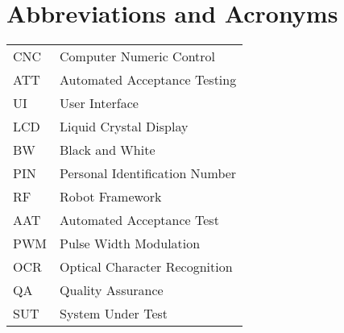 
\chapter*{Abbreviations and Acronyms}


\noindent
\begin{longtable}{@{}p{}p{}@{}}
CNC & Computer Numeric Control \\
ATT & Automated Acceptance Testing \\
UI & User Interface \\
LCD & Liquid Crystal Display \\
BW & Black and White \\
PIN & Personal Identification Number \\
RF & Robot Framework \\
AAT & Automated Acceptance Test \\
PWM & Pulse Width Modulation \\
OCR & Optical Character Recognition \\
QA & Quality Assurance \\
SUT & System Under Test \\

\end{longtable}
